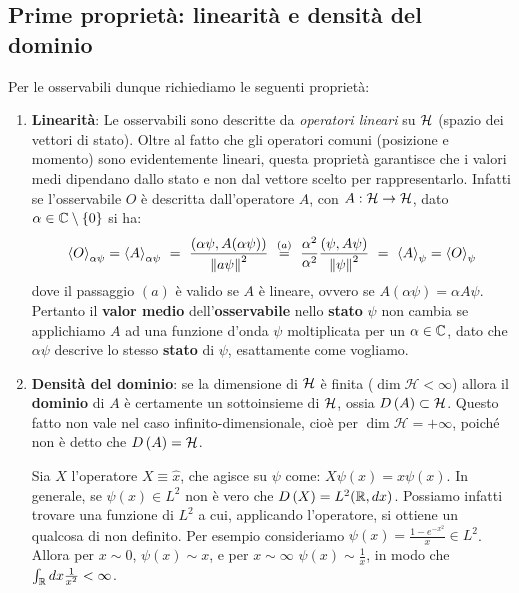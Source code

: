 \documentclass[FisicaTeorica.tex]{subfiles}
\begin{document}
\subsection{Prime proprietà: linearità e densità del dominio}
Per le osservabili dunque richiediamo le seguenti proprietà:
\begin{enumerate}
    \item \textbf{Linearità}: Le osservabili sono descritte da \emph{operatori lineari} su $\mathcal{H}$ (spazio dei vettori di stato).
    Oltre al fatto che gli operatori comuni (posizione e momento) sono evidentemente lineari, questa proprietà garantisce che i valori medi dipendano dallo stato e non dal vettore scelto per rappresentarlo. Infatti se l'osservabile $O$ è descritta dall'operatore $A$, con $A:\mathcal{H} \to \mathcal{H}$, dato $\alpha \in \mathbb{C}\setminus \{0\}$ si ha: 
    \[
    \avg{O}_{\alpha \psi} = \avg{A}_{\alpha \psi}  \ = \ \frac{(\alpha\psi,A(\alpha\psi))}{\norm{a\psi}^2} \ \overset{(a)}{=} \ \frac{\alpha^2}{\alpha^2} \frac{(\psi,A\psi)}{\norm{\psi}^2} \ = \ \avg{A}_\psi = \avg{O}_\psi
    \]
    dove il passaggio $(a)$ è valido se $A$ è lineare, ovvero se $A(\alpha \psi) = \alpha A\psi$. 
    Pertanto il \textbf{valor medio} dell'\textbf{osservabile} nello \textbf{stato} $\psi$ non cambia se applichiamo $A$ ad una funzione d'onda $\psi$ moltiplicata per un $\alpha \in \mathbb{C}$, dato che $\alpha\psi$ descrive lo stesso \textbf{stato} di $\psi$, esattamente come vogliamo.
	\item \textbf{Densità del dominio}:  se la dimensione di $\mathcal{H}$ è finita ($\dim{\mathcal{H}<\infty}$) allora il \textbf{dominio} di $A$ è certamente un sottoinsieme di $\mathcal{H}$, ossia $D\left(A\right)\subset \mathcal{H}$.
	Questo fatto non vale nel caso infinito-dimensionale, cioè per $\dim{\mathcal{H}=+\infty}$, poiché non è detto che $D\left(A\right)=\mathcal{H}$.
	\begin{es} Sia $X$ l'operatore  $X\equiv \hat{x}$, che agisce su $\psi$ come: $X\psi \left(x\right)=x\psi \left(x\right)$.
	In generale, se $\psi \left(x\right)\in L^2$ non è vero che $D\left(X\right)=L^2(\mathbb{R}, dx)$.
	Possiamo infatti trovare una funzione di $L^2$ a cui, applicando l'operatore, si ottiene un qualcosa di non definito. Per esempio consideriamo $\psi \left(x\right)=\frac{1-e^{-x^2}}{x}\in L^2$. Allora per $x\sim 0$, $\psi \left(x\right)\sim x$, e per $x\sim \infty$  $\psi \left(x\right)\sim \frac{1}{x}$, in modo che $\int_{\mathbb{R}} dx \frac{1}{x^2}<\infty$.

\end{es}
\end{enumerate}
\end{document}
